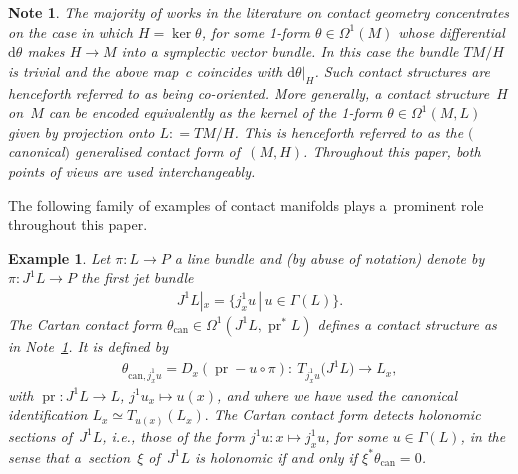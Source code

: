 \documentclass[pdftex]{sigma}
\numberwithin{equation}{section}
\newtheorem{Note}[Theorem]{Note}
\newtheorem{Example}[Theorem]{Example}
\newcommand{\de}{\mathrm{d}} %
\newcommand{\CM}{(M,H)} %
\begin{document}
\begin{Note}\label{obs:ct_mfs} The majority of works in the literature on contact geometry concentrates on the case in which $H = \ker \theta$, for some 1-form $\theta \in \Omega^1(M)$ whose dif\/ferential $\de \theta$ makes $H \to M$ into a symplectic vector bundle. In this case the bundle $TM/ H$ is trivial and the above map~$c$ coincides with $\de \theta|_H$. Such contact structures are henceforth referred to as being {\em co-oriented}. More generally, a contact structure~$H$ on~$M$ can be encoded equivalently as the kernel of the 1-form $\theta \in \Omega^1(M,L)$ given by projection onto $L: = T M/H$. This is henceforth referred to as the {\it $($canonical$)$ generalised contact form} of~$\CM$. Throughout this paper, both points of views are used interchangeably.
\end{Note}

The following family of examples of contact manifolds plays a~prominent role throughout this paper.

\begin{Example}\label{ex:jet_bundle}
Let $\pi\colon L\to P$ a line bundle and (by abuse of notation) denote by $\pi \colon J^1L\to P$ the {\it first jet bundle}
\begin{gather*} J^1 L|_x=\big\{j^1_xu\,|\, u\in\Gamma(L)\big\}.\end{gather*}
The Cartan contact form $ \theta_{\mathrm{can}}\in\Omega^1(J^1L,\operatorname{pr}^*L)$ def\/ines a contact structure as in Note~\ref{obs:ct_mfs}. It is def\/ined by
\begin{gather*}
 \theta_{\mathrm{can}, j^1_xu}=D_x(\operatorname{pr}-u\circ\pi)\colon \ T_{j^1_xu}\big(J^1L\big)\to L_{x},
\end{gather*}
with $\operatorname{pr}\colon J^1L\to L$, $j^1u_x\mapsto u(x)$, and where we have used the canonical identif\/ication $L_x\simeq T_{u(x)}(L_x).$ The Cartan contact form detects {\it holonomic} sections of~$J^1L$, i.e., those of the form $j^1u\colon x\mapsto j^1_xu$, for some $u\in\Gamma(L)$, in the sense that a~section~$\xi$ of~$J^1L$ is holonomic if and only if $\xi^*\theta_\text{can}=0$.
\end{Example}
\end{document}
